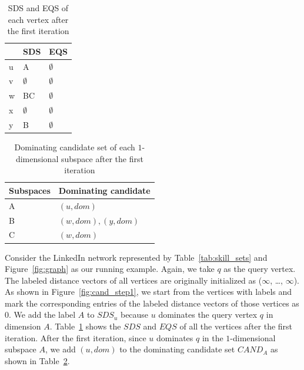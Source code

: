 \begin{table}[H]
    \centering
    \begin{tabular}{|l|l|l|}
    \hline
      & SDS         & EQS         \\ \hline
    u & A           & $\emptyset$ \\ \hline
    v & $\emptyset$ & $\emptyset$ \\ \hline
    w & BC          & $\emptyset$ \\ \hline
    x & $\emptyset$ & $\emptyset$ \\ \hline
    y & B           & $\emptyset$ \\ \hline
    \end{tabular}
    \caption{SDS and EQS of each vertex after the first iteration}
    \label{tab:sds_step1}
\end{table}

\begin{table}[H]
    \centering
    \begin{tabular}{|l|l|}
    \hline
    Subspaces & Dominating candidate \\ \hline
    A         & $(u, dom)$            \\ \hline
    B         & $(w, dom), (y, dom)$            \\ \hline
    C         & $(w, dom)$            \\ \hline
    \end{tabular}
    \caption{Dominating candidate set of each $1$-dimensional subspace after the first iteration}
    \label{tab:cand_set_step1}
\end{table}

Consider the LinkedIn network represented by Table~\ref{tab:skill_sets} and Figure~\ref{fig:graph} as our running example. Again, we take $q$ as the query vertex. The labeled distance vectors of all vertices are originally initialized as ($\infty$, \dots, $\infty$). As shown in Figure~\ref{fig:cand_step1}, we start from the vertices with labels and mark the corresponding entries of the labeled distance vectors of those vertices as $0$. 
We add the label $A$ to $\mathit{SDS}_u$ because $u$ dominates the query vertex $q$ in dimension $A$. Table~\ref{tab:sds_step1} shows the $\mathit{SDS}$ and $\mathit{EQS}$ of all the vertices after the first iteration.
After the first iteration, since $u$ dominates $q$ in the $1$-dimensional subspace $A$, we add $(u, dom)$ to the dominating candidate set $\mathit{CAND}_A$ as shown in Table~\ref{tab:cand_set_step1}.

